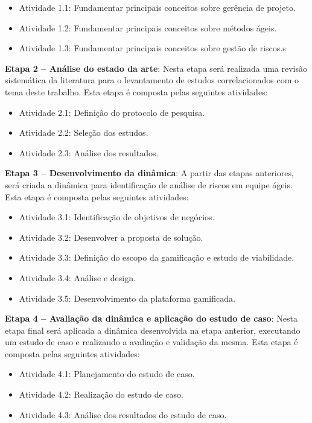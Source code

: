 \documentclass[
	12pt,
	openright,
	twoside,
	a4paper,
	english,
	brazil
	]{abntex2}
\begin{document}
\begin{itemize}
  \item[] Atividade 1.1: Fundamentar principais conceitos sobre gerência de projeto.
  \item[] Atividade 1.2: Fundamentar principais conceitos sobre métodos ágeis.
  \item[] Atividade 1.3: Fundamentar principais conceitos sobre gestão de riscos.s
\end{itemize}


\textbf{Etapa 2 -- Análise do estado da arte}: Nesta etapa será realizada uma revisão sistemática da literatura para o levantamento de estudos correlacionados com o tema deste trabalho. Esta etapa é composta pelas seguintes atividades:

\begin{itemize}
  \item[] Atividade 2.1: Definição do protocolo de pesquisa.
  \item[] Atividade 2.2: Seleção dos estudos.
  \item[] Atividade 2.3: Análise dos resultados.
\end{itemize}

\textbf{Etapa 3 -- Desenvolvimento da dinâmica}: A partir das etapas anteriores, será criada a dinâmica para identificação de análise de riscos em equipe ágeis. Esta etapa é composta pelas seguintes atividades:

\begin{itemize}

  \item[] Atividade 3.1: Identificação de objetivos de negócios.
  \item[] Atividade 3.2: Desenvolver a proposta de solução.
  \item[] Atividade 3.3: Definição do escopo da gamificação e estudo de viabilidade.
  \item[] Atividade 3.4: Análise e design.
  \item[] Atividade 3.5: Desenvolvimento da plataforma gamificada.

\end{itemize}

\textbf{Etapa 4 -- Avaliação da dinâmica e aplicação do estudo de caso}: Nesta etapa final será aplicada a dinâmica desenvolvida na etapa anterior, executando um estudo de caso e realizando a avaliação e validação da mesma. Esta etapa é composta pelas seguintes atividades:


\begin{itemize}
  \item[] Atividade 4.1: Planejamento do estudo de caso.
  \item[] Atividade 4.2: Realização do estudo de caso.
  \item[] Atividade 4.3: Análise dos resultados do estudo de caso.
\end{itemize}
\end{document}
